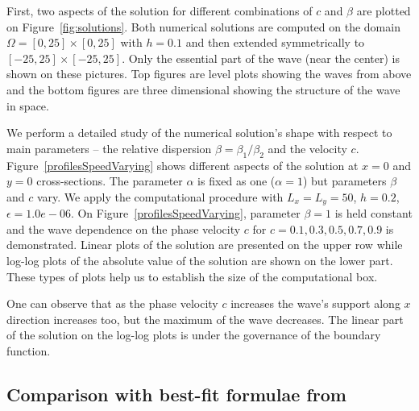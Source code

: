 \documentclass[preprint]{elsarticle}
\begin{document}
First, two aspects of the solution for different combinations of  $c$ and $\beta$   are plotted  on Figure~\ref{fig:solutions}. Both numerical solutions are computed on the  domain $\Omega = [0, 25]\times [0, 25]$ with $h = 0.1$ and then extended symmetrically to $ [-25, 25]\times [-25, 25]$. 
Only the essential part of the wave (near the center) is shown on these pictures. Top figures are level plots showing the waves from above and the bottom figures are 
three dimensional showing the structure of the wave in space. 


We perform a detailed study   of the numerical solution's shape with respect to main parameters -- the relative dispersion $\beta=\beta_1 / \beta_2$ and the velocity $c$.
 Figure~\ref{profilesSpeedVarying} shows different aspects of the solution at $x=0$ and $y=0$ cross-sections. The parameter $\alpha$  is fixed as one ($\alpha = 1$) but  parameters $\beta $ and $c$ vary. We apply  the computational procedure with  $L_x = L_y = 50$, $h = 0.2$, $\epsilon = 1.0e-06$. 
On Figure~\ref{profilesSpeedVarying}, parameter $\beta=1$ is held constant and the wave dependence on the phase velocity  $c$ for $c=0.1, 0.3, 0.5, 0.7, 0.9$ is demonstrated.  Linear plots of the solution are presented on the upper row while  log-log plots of the absolute value of the solution are shown on the lower part.  These types of plots help us to establish the size of the computational box. 

One can observe that as the phase velocity $c$ increases the wave's support  along $x$ direction increases too, but the maximum of the wave decreases. The linear part of the solution on the log-log plots is under the governance of the boundary function.



\subsection{Comparison with best-fit formulae from \cite{Ch2011}} 
\end{document}
